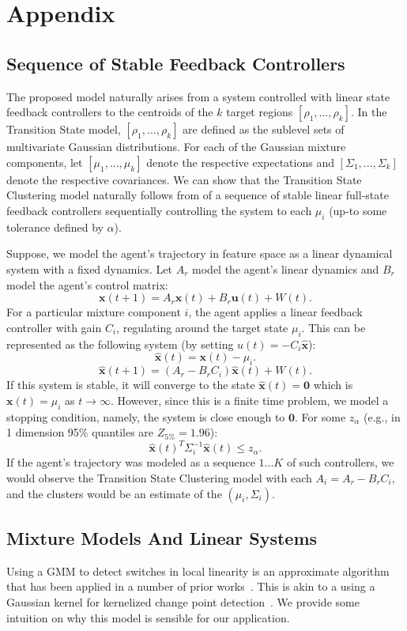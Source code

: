 \section{Appendix}

\subsection{Sequence of Stable Feedback Controllers}\label{sec:appendix1}
The proposed model naturally arises from a system controlled with linear state feedback controllers to the centroids of the $k$ target regions $[\rho_1,...,\rho_k]$. 
In the Transition State model,  $[\rho_1,...,\rho_k]$ are defined as the sublevel sets of multivariate Gaussian distributions.
For each of the Gaussian mixture components, let $[\mu_1,...,\mu_k]$ denote the respective expectations and $[\Sigma_1,...,\Sigma_k]$ denote the respective covariances.
We can show that the Transition State Clustering model naturally follows from of a sequence of stable linear full-state feedback controllers sequentially controlling the system to each $\mu_i$ (up-to some tolerance defined by $\alpha$).

Suppose, we model the agent's trajectory in feature space as a linear dynamical system with a fixed dynamics.
Let $A_r$ model the agent's linear dynamics and $B_r$ model the agent's control matrix:
\[
\mathbf{x}(t+1) = A_r\mathbf{x}(t) + B_r\mathbf{u}(t) + W(t).
\]
For a particular mixture component $i$, the agent applies a linear feedback controller with gain $C_i$, regulating around the target state $\mu_i$.
This can be represented as the following system (by setting $u(t)=-C_i\hat{\mathbf{x}}$):
\[
\hat{\mathbf{x}}(t) = \mathbf{x}(t) - \mu_i.
\]
\[
\hat{\mathbf{x}}(t+1) = (A_r-B_rC_i)\hat{\mathbf{x}}(t)+ W(t).
\]
If this system is stable, it will converge to the state $\hat{\mathbf{x}}(t) = \mathbf{0}$ which is  $\mathbf{x}(t) = \mu_i$ as $t \rightarrow \infty$.
However, since this is a finite time problem, we model a stopping condition, namely, the system is close enough to $\mathbf{0}$.
For some $z_\alpha$ (e.g., in 1 dimension 95\% quantiles are $Z_{5\%} = 1.96$):
\[
\hat{\mathbf{x}}(t)^T \Sigma^{-1}_i \hat{\mathbf{x}}(t) \le z_\alpha.
\]
If the agent's trajectory was modeled as a sequence $1...K$ of such controllers, we would observe the Transition State Clustering model with each $A_i = A_r-B_rC_i$, and the clusters would be an estimate of the $(\mu_i, \Sigma_i)$.

\subsection{Mixture Models And Linear Systems}\label{sec:appendix2}
Using a GMM to detect switches in local linearity is an approximate algorithm that has been applied in a number of prior works~\cite{moldovan2013dirichlet,calinon2014task, khansari2011learning}.
This is akin to a using a Gaussian kernel for kernelized change point detection~\cite{harchaoui2009kernel}.
We provide some intuition on why this model is sensible for our application.

